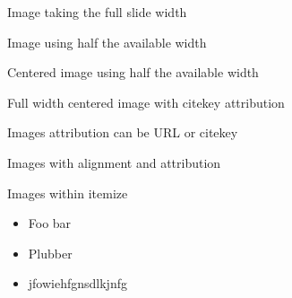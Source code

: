 \documentclass[11pt,compress,t,notes=noshow, xcolor=table]{beamer}
\begin{document}
\begin{frame}{Image taking the full slide width}
\end{frame}

\begin{frame}{Image using half the available width}
\end{frame}

\begin{frame}{Centered image using half the available width}
\end{frame}



\begin{frame}{Full width centered image with citekey attribution}
\end{frame}


\begin{frame}[c]{Images attribution can be URL or citekey}
  
  
\end{frame}

\begin{frame}{Images with alignment and attribution}
  
  
\end{frame}




\begin{frame}{Images within itemize}
  
  \begin{itemize}
    \item Foo bar
    \item Plubber
    \item jfowiehfgnsdlkjnfg
  \end{itemize}
  
\end{frame}
\end{document}
